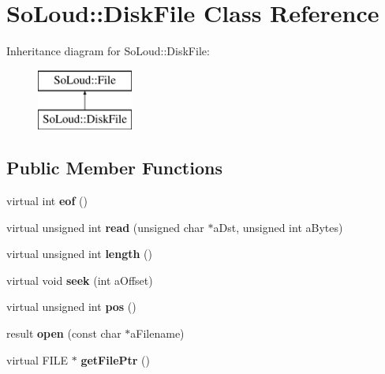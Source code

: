 \hypertarget{class_so_loud_1_1_disk_file}{}\section{So\+Loud\+:\+:Disk\+File Class Reference}
\label{class_so_loud_1_1_disk_file}
Inheritance diagram for So\+Loud\+:\+:Disk\+File\+:\begin{figure}[H]
\begin{center}
\leavevmode
\includegraphics[height=2.000000cm]{class_so_loud_1_1_disk_file}
\end{center}
\end{figure}
\subsection*{Public Member Functions}
\begin{DoxyCompactItemize}
\item 
\mbox{\label{class_so_loud_1_1_disk_file_ab865962be3faa73abd7df013961059bb}} 
virtual int {\bfseries eof} ()
\item 
\mbox{\label{class_so_loud_1_1_disk_file_a8c0f8b5adf303cf51ccd793a02348a7c}} 
virtual unsigned int {\bfseries read} (unsigned char $\ast$a\+Dst, unsigned int a\+Bytes)
\item 
\mbox{\label{class_so_loud_1_1_disk_file_ad6ba18b0d37b2245f0cc59b6077f7fcd}} 
virtual unsigned int {\bfseries length} ()
\item 
\mbox{\label{class_so_loud_1_1_disk_file_a7e0c8ee42fd0a39ea999819d77fcc036}} 
virtual void {\bfseries seek} (int a\+Offset)
\item 
\mbox{\label{class_so_loud_1_1_disk_file_a1a404b8aded2cccbd4bc2332b2e9f1b5}} 
virtual unsigned int {\bfseries pos} ()
\item 
\mbox{\label{class_so_loud_1_1_disk_file_ae9f3fc6d8b13f91fa1d9f4136a4643a4}} 
result {\bfseries open} (const char $\ast$a\+Filename)
\item 
\mbox{\label{class_so_loud_1_1_disk_file_a2a350a2d9326e39bb0b77b809aa69128}} 
virtual F\+I\+LE $\ast$ {\bfseries get\+File\+Ptr} ()
\end{DoxyCompactItemize}
